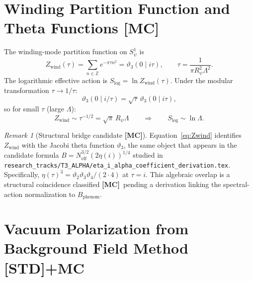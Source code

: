 \documentclass[12pt,a4paper]{article}
\theoremstyle{remark}
\newtheorem{remark}[theorem]{Remark}
\newcommand{\MC}{\textbf{[MC]}}
\newcommand{\STD}{\textbf{[STD]}}
\begin{document}
\section{Winding Partition Function and Theta Functions \MC}
\label{sec:theta}

The winding-mode partition function on $S^1_\psi$ is
\begin{equation}
  Z_{\mathrm{wind}}(\tau)
  = \sum_{n\in\mathbb{Z}} e^{-\pi\tau n^2}
  = \vartheta_3(0\mid i\tau),
  \qquad \tau = \frac{1}{\pi R_\psi^2\Lambda^2}.
  \label{eq:Zwind}
\end{equation}
The logarithmic effective action is
$S_{\mathrm{log}} = \ln Z_{\mathrm{wind}}(\tau)$.
Under the modular transformation $\tau\to 1/\tau$:
\begin{equation}
  \vartheta_3(0\mid i/\tau) = \sqrt{\tau}\,\vartheta_3(0\mid i\tau),
\end{equation}
so for small $\tau$ (large $\Lambda$):
\begin{equation}
  Z_{\mathrm{wind}} \sim \tau^{-1/2}
  = \sqrt{\pi}\,R_\psi\Lambda
  \qquad\Longrightarrow\qquad
  S_{\mathrm{log}} \sim \ln\Lambda.
  \label{eq:logfromtheta}
\end{equation}

\begin{remark}[Structural bridge candidate \MC]
Equation~\eqref{eq:Zwind} identifies $Z_{\mathrm{wind}}$ with the
Jacobi theta function $\vartheta_3$, the same object that appears in the
candidate formula $B = N_{\mathrm{eff}}^{3/2}(2\eta(i))^{1/4}$ studied
in \texttt{research\_tracks/T3\_ALPHA/eta\_i\_alpha\_coefficient\_derivation.tex}.
Specifically, $\eta(\tau)^3 = \vartheta_2\vartheta_3\vartheta_4/(2\cdot 4)$
at $\tau=i$.  This algebraic overlap is a structural coincidence
classified \MC\ pending a derivation linking the spectral-action
normalization to $B_{\mathrm{phenom}}$.
\end{remark}

\section{Vacuum Polarization from Background Field Method \STD+MC}
\label{sec:bgfield}
\end{document}
